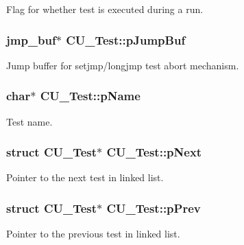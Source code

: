 Flag for whether test is executed during a run. 

\hypertarget{structCU__Test_ada5212c6bacdbaf9319968d895a69ce4}{
\subsubsection[{p\-Jump\-Buf}]{\setlength{\rightskip}{0pt plus 5cm}jmp\-\_\-buf$\ast$ C\-U\-\_\-\-Test\-::p\-Jump\-Buf}}\label{structCU__Test_ada5212c6bacdbaf9319968d895a69ce4}


Jump buffer for setjmp/longjmp test abort mechanism. 

\hypertarget{structCU__Test_ae1f688f9e108805d7f59ee364c5eb2a2}{
\subsubsection[{p\-Name}]{\setlength{\rightskip}{0pt plus 5cm}char$\ast$ C\-U\-\_\-\-Test\-::p\-Name}}\label{structCU__Test_ae1f688f9e108805d7f59ee364c5eb2a2}


Test name. 

\hypertarget{structCU__Test_abca70319a9ee946094bd7de3e3207141}{
\subsubsection[{p\-Next}]{\setlength{\rightskip}{0pt plus 5cm}struct {\bf C\-U\-\_\-\-Test}$\ast$ C\-U\-\_\-\-Test\-::p\-Next}}\label{structCU__Test_abca70319a9ee946094bd7de3e3207141}


Pointer to the next test in linked list. 

\hypertarget{structCU__Test_a1b0ae6d72f43397547a0ff3680001c24}{
\subsubsection[{p\-Prev}]{\setlength{\rightskip}{0pt plus 5cm}struct {\bf C\-U\-\_\-\-Test}$\ast$ C\-U\-\_\-\-Test\-::p\-Prev}}\label{structCU__Test_a1b0ae6d72f43397547a0ff3680001c24}


Pointer to the previous test in linked list. 

